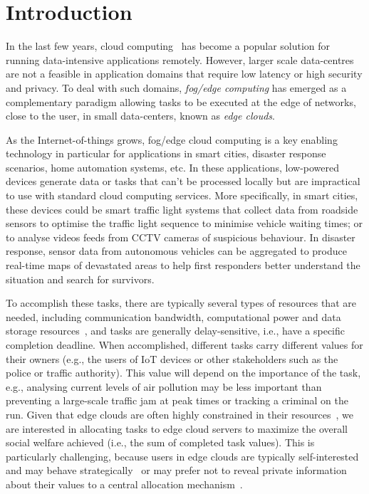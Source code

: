 \section{Introduction}\label{sec:introduction}
In the last few years, cloud computing~\cite{cloud_cite} has become a popular solution for running data-intensive
applications remotely. However, larger scale data-centres are not a feasible in application domains that require low
latency or high security and privacy. To deal with such domains, \emph{fog/edge computing} has emerged as a
complementary paradigm allowing tasks to be executed at the edge of networks, close to the user, in small data-centers,
known as \emph{edge clouds}.

As the Internet-of-things grows, fog/edge cloud computing is a key enabling technology in particular for applications
in smart cities, disaster response scenarios, home automation systems, etc. In these applications, low-powered devices
generate data or tasks that can't be processed locally but are impractical to use with standard cloud computing
services. More specifically, in smart cities, these devices could be smart traffic light systems that collect data from
roadside sensors to optimise the traffic light sequence to minimise vehicle waiting times; or to analyse videos feeds
from CCTV cameras of suspicious behaviour. In disaster response, sensor data from autonomous vehicles can be aggregated
to produce real-time maps of devastated areas to help first responders better understand the situation and search for
survivors.

To accomplish these tasks, there are typically several types of resources that are needed, including communication
bandwidth, computational power and data storage resources~\citep{vaji_infocom}, and tasks are generally
delay-sensitive, i.e., have a specific completion deadline. When accomplished, different tasks carry different values
for their owners (e.g., the users of IoT devices or other stakeholders such as the police or traffic authority). This
value will depend on the importance of the task, e.g., analysing current levels of air pollution may be less important
than preventing a large-scale traffic jam at peak times or tracking a criminal on the run. Given that edge clouds are
often highly constrained in their resources~\cite{edge_limitations}, we are interested in allocating tasks to edge
cloud servers to maximize the overall social welfare achieved (i.e., the sum of completed task values). This is
particularly challenging, because users in edge clouds are typically self-interested and may behave
strategically~\cite{Bi2019} or may prefer not to reveal private information about their values to a central allocation
mechanism~\cite{Pai2013}.

